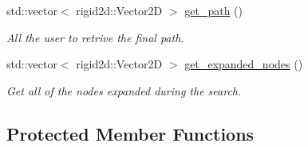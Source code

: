 \begin{DoxyCompactItemize}
std\+::vector$<$ rigid2d\+::\+Vector2D $>$ \hyperlink{classhsearch_1_1HSearch_a2dbcfc312e89d60d9ec9b85eef271cbf}{get\+\_\+path} ()
\begin{DoxyCompactList}\small\item\em All the user to retrive the final path. \end{DoxyCompactList}\item 
std\+::vector$<$ rigid2d\+::\+Vector2D $>$ \hyperlink{classhsearch_1_1HSearch_a93b63eb8983863eb40f7bb1f28af5c36}{get\+\_\+expanded\+\_\+nodes} ()
\begin{DoxyCompactList}\small\item\em Get all of the nodes expanded during the search. \end{DoxyCompactList}\end{DoxyCompactItemize}
\subsection*{Protected Member Functions}

